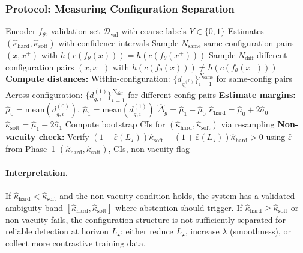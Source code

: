 \documentclass[11pt]{article}
\theoremstyle{remark}
\theoremstyle{plain}
\begin{document}
\subsubsection{Protocol: Measuring Configuration Separation}

\begin{algorithm}[H]
\caption{Margin Estimation on Validation Pairs}
\label{alg:margin-estimation}
\begin{algorithmic}[1]
\Require Encoder $f_\theta$, validation set $\mathcal{D}_{\mathrm{val}}$ with coarse labels $Y \in \{0,1\}$
\Ensure Estimates $(\hat\kappa_{\mathrm{hard}}, \hat\kappa_{\mathrm{soft}})$ with confidence intervals
\State Sample $N_{\mathrm{same}}$ same-configuration pairs $(x,x^+)$ with $h(c(f_\theta(x))) = h(c(f_\theta(x^+)))$
\State Sample $N_{\mathrm{diff}}$ different-configuration pairs $(x,x^-)$ with $h(c(f_\theta(x))) \neq h(c(f_\theta(x^-)))$
\State \textbf{Compute distances:}
\State \quad Within-configuration: $\{d_{g^{(0)}_i}\}_{i=1}^{N_{\mathrm{same}}}$ for same-config pairs
\State \quad Across-configuration: $\{d_{g,i}^{(1)}\}_{i=1}^{N_{\mathrm{diff}}}$ for different-config pairs
\State \textbf{Estimate margins:}
\State \quad $\hat\mu_0 = \text{mean}(d_{g,i}^{(0)})$, \quad $\hat\mu_1 = \text{mean}(d_{g,i}^{(1)})$
\State \quad $\hat\Delta_g = \hat\mu_1 - \hat\mu_0$
\State \quad $\hat\kappa_{\mathrm{hard}} = \hat\mu_0 + 2\hat\sigma_0$ \quad {}
\State \quad $\hat\kappa_{\mathrm{soft}} = \hat\mu_1 - 2\hat\sigma_1$ \quad {}
\State Compute bootstrap CIs for $(\hat\kappa_{\mathrm{hard}}, \hat\kappa_{\mathrm{soft}})$ via resampling
\State \textbf{Non-vacuity check:} Verify $(1-\hat\varepsilon(L_\star))\hat\kappa_{\mathrm{soft}} - (1+\hat\varepsilon(L_\star))\hat\kappa_{\mathrm{hard}} > 0$ using $\hat\varepsilon$ from Phase~1
\State \Return $(\hat\kappa_{\mathrm{hard}}, \hat\kappa_{\mathrm{soft}})$, CIs, non-vacuity flag
\end{algorithmic}
\end{algorithm}

\paragraph{Interpretation.}
If $\hat\kappa_{\mathrm{hard}} < \hat\kappa_{\mathrm{soft}}$ and the non-vacuity condition holds, the system has a validated ambiguity band $[\hat\kappa_{\mathrm{hard}}, \hat\kappa_{\mathrm{soft}}]$ where abstention should trigger. If $\hat\kappa_{\mathrm{hard}} \ge \hat\kappa_{\mathrm{soft}}$ or non-vacuity fails, the configuration structure is not sufficiently separated for reliable detection at horizon $L_\star$; either reduce $L_\star$, increase $\lambda$ (smoothness), or collect more contrastive training data.
\end{document}
